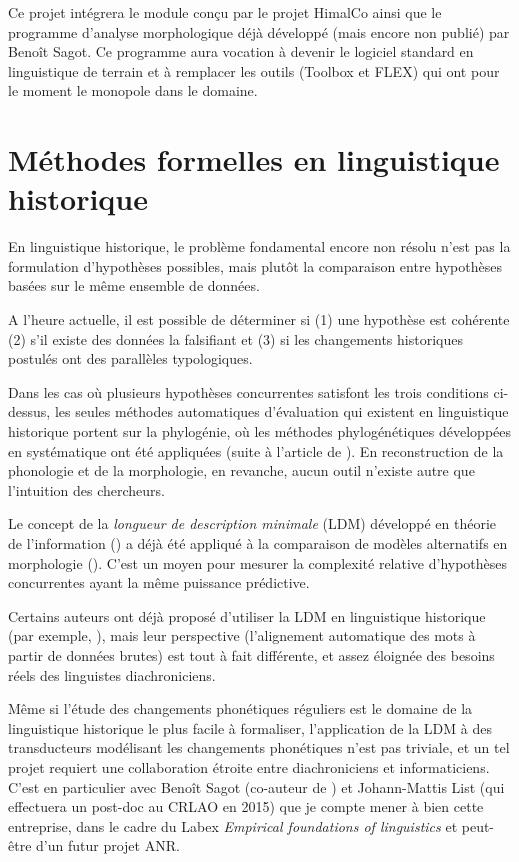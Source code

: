 \documentclass[oldfontcommands,oneside,a4paper,11pt]{article}
\begin{document}
Ce projet intégrera le module conçu par le projet HimalCo ainsi que le programme d'analyse morphologique déjà développé (mais encore non publié) par Benoît Sagot. Ce programme aura vocation à devenir le logiciel standard en linguistique de terrain et à remplacer les outils (Toolbox et FLEX) qui ont pour le moment le monopole dans le domaine.

\section{Méthodes formelles en linguistique historique}

En linguistique historique, le problème fondamental encore non résolu n'est pas la formulation d'hypothèses possibles, mais plutôt la comparaison entre hypothèses basées sur le même ensemble de données. 

A l'heure actuelle, il est possible de déterminer si (1) une hypothèse est cohérente (2) s'il existe des données la falsifiant et (3) si les changements historiques postulés ont des parallèles typologiques. 

Dans les cas où plusieurs hypothèses concurrentes satisfont les trois conditions ci-dessus, les seules méthodes automatiques d'évaluation qui existent en linguistique historique portent sur la phylogénie, où les méthodes phylogénétiques développées en systématique ont été appliquées (suite à l'article de \citealt{gray03ie}). En reconstruction de la phonologie et de la morphologie, en revanche, aucun outil n'existe autre que l'intuition des chercheurs. 

Le concept de la \textit{longueur de description minimale} (LDM) développé en théorie de l'information (\citealt{rissanen84}) a déjà été appliqué à la comparaison de modèles alternatifs en morphologie (\citealt{walther14compactness}). C'est un moyen pour mesurer la complexité relative d'hypothèses concurrentes ayant la même puissance prédictive. 

Certains auteurs ont déjà proposé d'utiliser la  LDM en linguistique historique (par exemple, \citealt{hiltunen12mdl}), mais leur perspective (l'alignement automatique des mots à partir de données brutes) est tout à fait différente, et assez éloignée des besoins réels des linguistes diachroniciens.

Même si l'étude des changements phonétiques réguliers est le domaine de la linguistique historique le plus facile à formaliser, l'application de la LDM à des transducteurs modélisant les changements phonétiques n'est pas triviale, et un tel projet requiert une collaboration étroite entre diachroniciens et informaticiens. C'est en particulier avec Benoît Sagot (co-auteur de \citealt{walther14compactness}) et Johann-Mattis List (qui effectuera un post-doc au CRLAO en 2015) que je compte mener à bien cette entreprise, dans le cadre du Labex \textit{Empirical foundations of linguistics} et peut-être d'un futur projet ANR.
\end{document}

